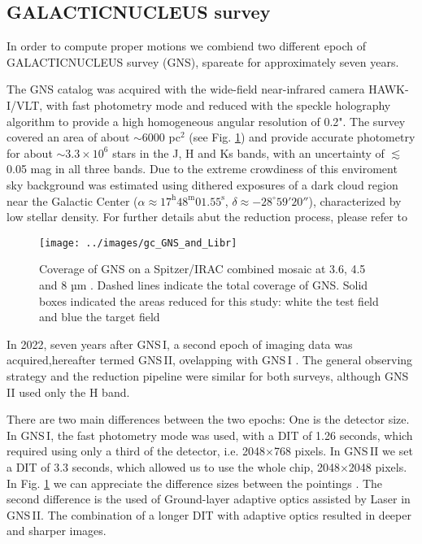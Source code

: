 \documentclass{aa} %
\begin{document}
	\subsection{GALACTICNUCLEUS survey}
	
	In order to compute proper motions we combiend two different epoch of GALACTICNUCLEUS survey (GNS), spareate for approximately seven years. 
	
	The GNS catalog \citep[][hereafter GNS\,I]{GNSII} was acquired with the wide-field near-infrared camera HAWK-I/VLT, with fast photometry mode and reduced with the speckle holography algorithm \citep[][]{Holography} to provide a high homogeneous angular resolution of 0.2". The survey covered an area of about $\sim$6000 pc$^{2}$ (see Fig. \ref{fig:gcview}) and provide accurate photometry for about $\sim 3.3 \times 10^{6}$ stars in the J, H and Ks bands, with an uncertainty of $\lesssim$ 0.05 mag in all three bands. Due to the extreme crowdiness of this enviroment sky background was estimated using dithered exposures of a dark cloud region near the Galactic Center ($\alpha \approx 17^\mathrm{h}48^\mathrm{m}01.55^\mathrm{s}$, $\delta \approx -28^\circ59'20''$), characterized by low stellar density. For further details  abut the reduction process, please refer to \cite{GNSI, GNSII}
	
	\begin{figure}
		\centering
		\texttt{[image: ../images/gc\_GNS\_and\_Libr]}
		\caption{Coverage of GNS on a Spitzer/IRAC combined mosaic at 3.6, 4.5 and 8 µm \citep{Spitzer_image}. Dashed lines indicate the total coverage of GNS. Solid boxes indicated the areas reduced for this study: white the test field and blue the target field }
		\label{fig:gcview}
	\end{figure}
	
	In 2022, seven years after  GNS\,I, a second epoch of imaging data was acquired,hereafter termed GNS\,II, ovelapping with GNS\,I . The general observing strategy and the reduction pipeline were similar for both surveys, although GNS\,II used only the H band.
	
	There are two main differences between the two epochs: One is the detector size. In  GNS\,I, the fast photometry mode was used, with a DIT of 1.26 seconds, which required using only a third of the detector, i.e. 2048$\times$768 pixels. In  GNS\,II we set a DIT of 3.3 seconds, which  allowed us to use the whole chip, 2048$\times$2048 pixels. In Fig. \ref{fig:gcview} we can appreciate the difference sizes  between the pointings . The second difference is the used of Ground-layer adaptive optics assisted by Laser \citep[GRAAL,][]{GRAAL} in  GNS\,II. The combination of a longer DIT with adaptive optics resulted in deeper and sharper images.
	
\end{document}
